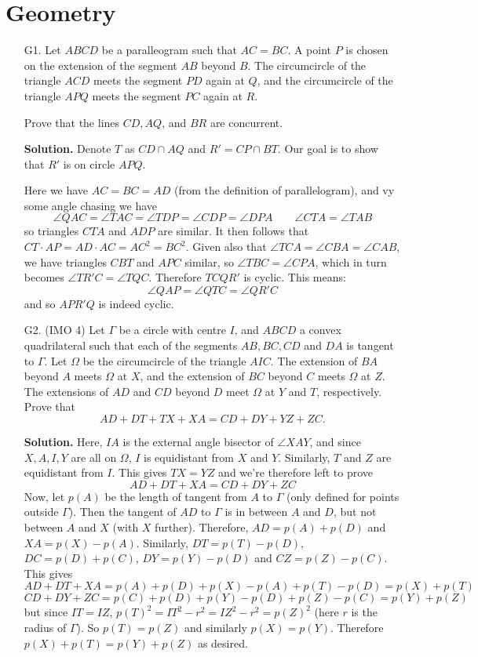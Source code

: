 \documentclass[11pt,a4paper]{article}
\begin{document}
	\section*{Geometry}
	\begin{enumerate}
		\item [G1.]  Let $ABCD$ be a paralleogram such that $AC = BC$. A point $P$ is chosen on the extension of the segment $AB$ beyond $B$. 
		The circumcircle of the triangle $ACD$ meets the segment $PD$ again at $Q$, and the circumcircle of the triangle $APQ$ meets the segment $PC$ again at $R$.
		
		Prove that the lines $CD, AQ$, and $BR$ are concurrent.
		
		\textbf{Solution.} 
		Denote $T$ as $CD\cap AQ$ and $R'=CP\cap BT$. Our goal is to show that $R'$ is on circle $APQ$. 
		 
		Here we have $AC=BC=AD$ (from the definition of parallelogram), and vy some angle chasing we have 
		\[
		\angle QAC = \angle TAC = \angle TDP = \angle CDP = \angle DPA
		\qquad 
		\angle CTA = \angle TAB
		\]
		so triangles $CTA$ and $ADP$ are similar. It then follows that $CT\cdot AP = AD\cdot AC = AC^2=BC^2$. 
		Given also that $\angle TCA = \angle CBA=\angle CAB$, we have triangles $CBT$ and $APC$ similar, so $\angle TBC = \angle CPA$, which in turn becomes 
		$\angle TR'C=\angle TQC$. Therefore $TCQR'$ is cyclic. 
		This means: 
		\[
		\angle QAP = \angle QTC = \angle QR'C
		\]
		and so $APR'Q$ is indeed cyclic. 
		
		\item [G2.] (IMO 4)
		Let $\Gamma$ be a circle with centre $I$, and $A B C D$ a convex quadrilateral such that each of the segments $A B, B C, C D$ and $D A$ is tangent to $\Gamma$. Let $\Omega$ be the circumcircle of the triangle $A I C$. The extension of $B A$ beyond $A$ meets $\Omega$ at $X$, and the extension of $B C$ beyond $C$ meets $\Omega$ at $Z$. The extensions of $A D$ and $C D$ beyond $D$ meet $\Omega$ at $Y$ and $T$, respectively. Prove that\[A D+D T+T X+X A=C D+D Y+Y Z+Z C.\]
		
		\textbf{Solution.} 
		Here, $IA$ is the external angle bisector of $\angle XAY$, and since $X, A, I, Y$ are all on $\Omega$, 
		$I$ is equidistant from $X$ and $Y$. 
		Similarly, 
		$T$ and $Z$ are equidistant from $I$. This gives $TX = YZ$ and we're therefore left to prove 
		\[
		A D+D T+X A=C D+D Y+Z C
		\]
		Now, let $p(A)$ be the length of tangent from $A$ to $\Gamma$ (only defined for points outside $\Gamma$). 
		Then the tangent of $AD$ to $\Gamma$ is in between $A$ and $D$, but not between $A$ and $X$ (with $X$ further).
		Therefore, $AD = p(A) + p(D)$ and $XA=p(X) - p(A)$. 
		Similarly, $DT = p(T) - p(D)$, $DC = p(D) + p(C)$, $DY = p(Y) - p(D)$ and $CZ = p(Z) - p(C)$. 
		This gives 
		\[
		A D+D T+X A
		=p(A) + p(D) + p(X) - p(A) + p(T) - p(D) = p(X) + p(T)
		\]\[
		C D+D Y+Z C
		=p(C) + p(D) + p(Y) - p(D) + p(Z) - p(C) = p(Y) + p(Z)
		\]
		but since $IT=IZ$, $p(T)^2 = IT^2 - r^2 = IZ^2 - r^2 = p(Z)^2$ (here $r$ is the radius of $\Gamma$). 
		So $p(T)=p(Z)$ and similarly $p(X)=p(Y)$. 
		Therefore $p(X) + p(T)=p(Y) + p(Z)$ as desired. 
		

\end{enumerate}
\end{document}
